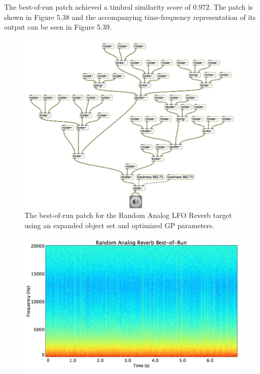 \documentclass[12pt]{report} 	%
\numberwithin{figure}{chapter}
\numberwithin{table}{chapter}
\numberwithin{equation}{chapter}
\begin{document}
\begin{flushleft}
The best-of-run patch achieved a timbral similarity score of $0.972$. The patch is shown in Figure 5.38 and the accompanying time-frequency representation of its output can be seen in Figure 5.39.

\begin{figure}[h!]
\begin{center}
\includegraphics[angle=270, scale=0.65]{RandomAnalog_Best}
\caption[Random analog LFO reverb best-of-run patch]{The best-of-run patch for the Random Analog LFO Reverb target using an expanded object set and optimized GP parameters.}
\end{center}
\end{figure}
\begin{figure}[h!]
\begin{center}
\includegraphics[scale=0.35,width=\linewidth]{RandomAnalogReverbBestOfRunSTFT}

\end{center}
\end{figure}
\end{flushleft}
\end{document}
